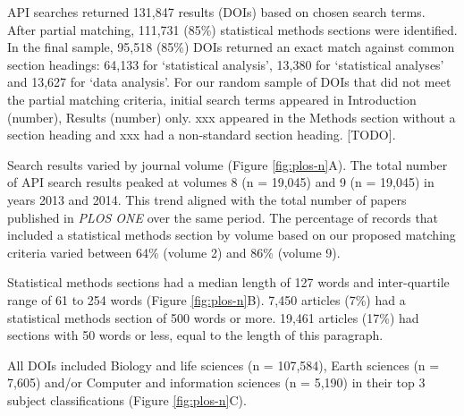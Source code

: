 \documentclass[12pt]{article}
\begin{document}
API searches returned 131,847 results (DOIs) based on chosen search
terms. After partial matching, 111,731 (85\%) statistical methods
sections were identified. In the final sample, 95,518 (85\%) DOIs
returned an exact match against common section headings: 64,133 for
`statistical analysis', 13,380 for `statistical analyses' and 13,627 for
`data analysis'. For our random sample of DOIs that did not meet the
partial matching criteria, initial search terms appeared in Introduction
(number), Results (number) only. xxx appeared in the Methods section
without a section heading and xxx had a non-standard section heading.
{[}TODO{]}.

Search results varied by journal volume (Figure \ref{fig:plos-n}A). The
total number of API search results peaked at volumes 8 (n = 19,045) and
9 (n = 19,045) in years 2013 and 2014. This trend aligned with the total
number of papers published in \emph{PLOS ONE} over the same period. The
percentage of records that included a statistical methods section by
volume based on our proposed matching criteria varied between 64\%
(volume 2) and 86\% (volume 9).

Statistical methods sections had a median length of 127 words and
inter-quartile range of 61 to 254 words (Figure \ref{fig:plos-n}B).
7,450 articles (7\%) had a statistical methods section of 500 words or
more. 19,461 articles (17\%) had sections with 50 words or less, equal
to the length of this paragraph.

All DOIs included Biology and life sciences (n = 107,584), Earth
sciences (n = 7,605) and/or Computer and information sciences (n =
5,190) in their top 3 subject classifications (Figure
\ref{fig:plos-n}C).
\end{document}
